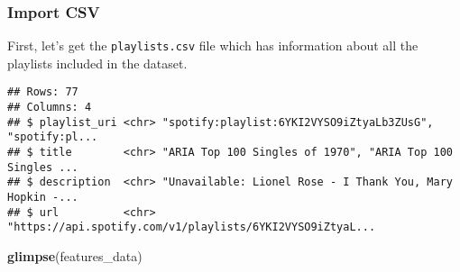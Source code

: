\documentclass[
]{article}
\newenvironment{Shaded}{\begin{snugshade}}{\end{snugshade}}
\newcommand{\DataTypeTok}[1]{\textcolor[rgb]{0.13,0.29,0.53}{#1}}
\newcommand{\KeywordTok}[1]{\textcolor[rgb]{0.13,0.29,0.53}{\textbf{#1}}}
\newcommand{\NormalTok}[1]{#1}
\newcommand{\OperatorTok}[1]{\textcolor[rgb]{0.81,0.36,0.00}{\textbf{#1}}}
\newcommand{\StringTok}[1]{\textcolor[rgb]{0.31,0.60,0.02}{#1}}
\begin{document}
\hypertarget{import-csv}{%
\subsubsection{Import CSV}\label{import-csv}}

First, let's get the \texttt{playlists.csv} file which has information
about all the playlists included in the dataset.

\begin{Shaded}
\end{Shaded}

\begin{verbatim}
## Rows: 77
## Columns: 4
## $ playlist_uri <chr> "spotify:playlist:6YKI2VYSO9iZtyaLb3ZUsG", "spotify:pl...
## $ title        <chr> "ARIA Top 100 Singles of 1970", "ARIA Top 100 Singles ...
## $ description  <chr> "Unavailable: Lionel Rose - I Thank You, Mary Hopkin -...
## $ url          <chr> "https://api.spotify.com/v1/playlists/6YKI2VYSO9iZtyaL...
\end{verbatim}

\begin{Shaded}
\begin{Highlighting}[]
\KeywordTok{glimpse}\NormalTok{(features_data)}
\end{Highlighting}
\end{Shaded}
\end{document}
